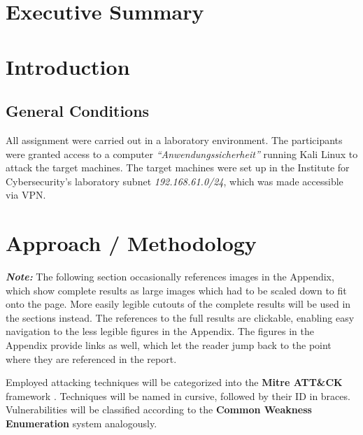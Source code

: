 \documentclass[11pt]{article}
\begin{document}
\newpage

\section{Executive Summary}
\vspace{-2mm}



\newpage





\newpage

\section{Introduction}

\subsection{General Conditions}
All assignment were carried out in a laboratory environment.
The participants were granted access to a computer \textit{\enquote{Anwendungssicherheit}} running Kali Linux to attack the target machines.
The target machines were set up in the Institute for Cybersecurity's laboratory subnet \textit{192.168.61.0/24}, which was made accessible via VPN.







\section{Approach / Methodology}
\textbf{\textit{Note:}} The following section occasionally references images in the Appendix, which show complete results as large images which had to be scaled down to fit onto the page.  More easily legible cutouts of the complete results will be used in the sections instead. The references to the full results are clickable, enabling easy navigation to the less legible figures in the Appendix. The figures in the Appendix provide links as well, which let the reader jump back to the point where they are referenced in the report.

Employed attacking techniques will be categorized into the \textbf{Mitre ATT\&CK} framework \autocite{mitre:attack}. Techniques will be named in cursive, followed by their ID in braces.
Vulnerabilities will be classified according to the \textbf{Common Weakness Enumeration} \autocite{mitre:cwe} system analogously.
\\[1em]
\end{document}
